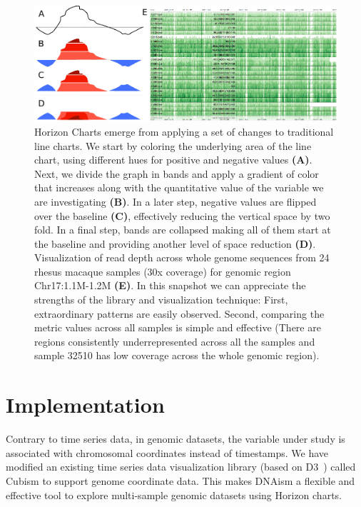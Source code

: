 \documentclass{bioinfo}
\begin{document}
\begin{figure}
\centerline{\includegraphics{figure.pdf}}
\caption{
Horizon Charts emerge from applying a set of changes to
traditional line charts. We start by coloring the underlying area of the line
chart, using different hues for positive and negative values \textbf{(A)}. Next, we
divide the graph in bands and apply a gradient of color that increases along
with the quantitative value of the variable we are investigating \textbf{(B)}. In a later
step, negative values are flipped over the baseline \textbf{(C)}, effectively
reducing the vertical space by two fold. In a final step, bands are collapsed
making all of them start at the baseline and providing another level of space
reduction \textbf{(D)}.  Visualization of read depth across whole genome sequences from
24 rhesus macaque samples (30x coverage) for genomic region Chr17:1.1M-1.2M
\textbf{(E)}. In this snapshot we can appreciate the strengths of the library and
visualization technique: First, extraordinary patterns are easily observed.
Second, comparing the metric values across all samples is simple and
effective (There are regions consistently underrepresented across all the
samples and sample 32510 has low coverage across the whole genomic region).
}\label{fig:01}
\end{figure}



\section{Implementation}

Contrary to time series data, in genomic datasets, the variable under study is
associated with chromosomal coordinates instead of timestamps. We have modified
an existing time series data visualization library (based on D3~\citep{2011-d3})
called Cubism to support genome coordinate data. This makes DNAism
a flexible and effective tool to explore multi-sample genomic datasets using
Horizon charts.
\end{document}
